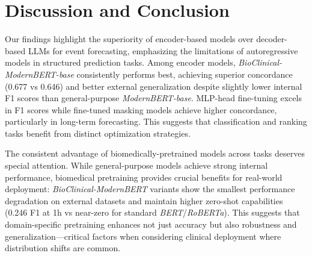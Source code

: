 \documentclass[letterpaper]{article} %
\begin{document}


\section{Discussion and Conclusion}

Our findings highlight the superiority of encoder-based models over decoder-based LLMs for event forecasting, emphasizing the limitations of autoregressive models in structured prediction tasks. Among encoder models, \textit{BioClinical-ModernBERT-base} consistently performs best, achieving superior concordance (0.677 vs 0.646) and better external generalization despite slightly lower internal F1 scores than general-purpose \textit{ModernBERT-base}. MLP-head fine-tuning excels in F1 scores while fine-tuned masking models achieve higher concordance, particularly in long-term forecasting. This suggests that classification and ranking tasks benefit from distinct optimization strategies.

The consistent advantage of biomedically-pretrained models across tasks deserves special attention. While general-purpose models achieve strong internal performance, biomedical pretraining provides crucial benefits for real-world deployment: \textit{BioClinical-ModernBERT} variants show the smallest performance degradation on external datasets and maintain higher zero-shot capabilities (0.246 F1 at 1h vs near-zero for standard \textit{BERT}/\textit{RoBERTa}). This suggests that domain-specific pretraining enhances not just accuracy but also robustness and generalization—critical factors when considering clinical deployment where distribution shifts are common.
\end{document}
